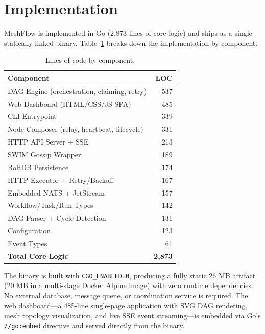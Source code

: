 \section{Implementation}

MeshFlow is implemented in Go (2,873 lines of core logic) and ships as a single statically linked binary. Table~\ref{tab:code-size} breaks down the implementation by component.

\begin{table}[h]
\centering
\caption{Lines of code by component.}
\label{tab:code-size}
\begin{tabular}{lr}
\toprule
\textbf{Component} & \textbf{LOC} \\
\midrule
DAG Engine (orchestration, claiming, retry) & 537 \\
Web Dashboard (HTML/CSS/JS SPA) & 485 \\
CLI Entrypoint & 339 \\
Node Composer (relay, heartbeat, lifecycle) & 331 \\
HTTP API Server + SSE & 213 \\
SWIM Gossip Wrapper & 189 \\
BoltDB Persistence & 174 \\
HTTP Executor + Retry/Backoff & 167 \\
Embedded NATS + JetStream & 157 \\
Workflow/Task/Run Types & 142 \\
DAG Parser + Cycle Detection & 131 \\
Configuration & 123 \\
Event Types & 61 \\
\midrule
\textbf{Total Core Logic} & \textbf{2,873} \\
\bottomrule
\end{tabular}
\end{table}

The binary is built with \texttt{CGO\_ENABLED=0}, producing a fully static 26 MB artifact (20 MB in a multi-stage Docker Alpine image) with zero runtime dependencies. No external database, message queue, or coordination service is required. The web dashboard---a 485-line single-page application with SVG DAG rendering, mesh topology visualization, and live SSE event streaming---is embedded via Go's \texttt{//go:embed} directive and served directly from the binary.
